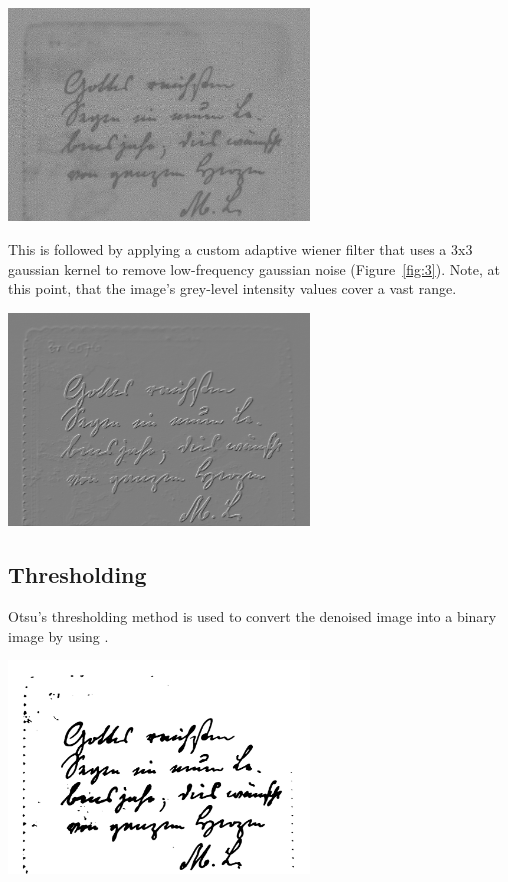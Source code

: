 \documentclass[a4paper, 12pt]{report}
\begin{document}
\noindent
\begin{minipage}{\linewidth}
    \centering
    \includegraphics[width=8cm]{wavelet difference.png}
    \label{fig:2}
\end{minipage}

This is followed by applying a custom adaptive wiener filter that uses a 3x3 gaussian kernel to remove low-frequency gaussian noise (Figure~\ref{fig:3}). Note, at this point, that the image's grey-level intensity values cover a vast range.

\noindent
\begin{minipage}{\linewidth}
    \centering
    \includegraphics[width=8cm]{wiener difference.png}
    \label{fig:3}
\end{minipage}

\subsection{Thresholding}
Otsu's thresholding method is used to convert the denoised image into a binary image by using .

\noindent
\begin{minipage}{\linewidth}
    \centering
    \includegraphics[width=8cm]{otsu thresholded.png}
    \label{fig:4}
\end{minipage}
\end{document}
